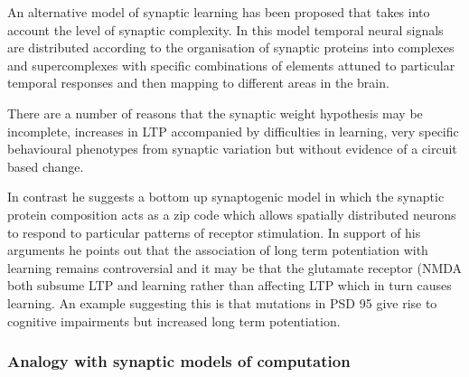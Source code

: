 An alternative model of synaptic learning has been proposed that takes into account the level of synaptic complexity. In this model temporal neural signals are distributed according to the organisation of synaptic proteins into complexes and supercomplexes with specific combinations of elements attuned to particular temporal responses and then mapping to different areas in the brain. 

There are a number of reasons that the synaptic weight hypothesis may be incomplete, increases in LTP accompanied by difficulties in learning, very specific behavioural phenotypes from synaptic variation but without evidence of a circuit based change. 

 In contrast he suggests a bottom up synaptogenic model in which the synaptic protein composition acts as a zip code which allows spatially distributed neurons to respond to particular patterns of receptor stimulation. In support of his arguments he points out that the association of long term potentiation with learning remains controversial and it may be that the glutamate receptor (NMDA both subsume LTP and learning rather than affecting LTP which in turn causes learning. An example suggesting this is that mutations in PSD 95 give rise to cognitive impairments but increased long term potentiation.

\subsubsection{Analogy with synaptic models of computation}

